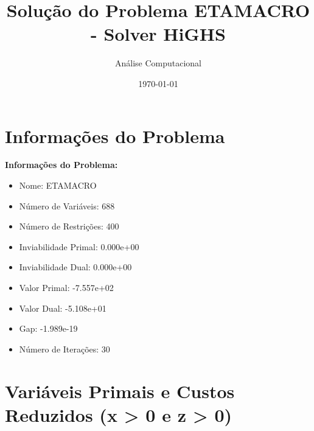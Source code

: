\documentclass[12pt]{article}
\title{Solução do Problema ETAMACRO - Solver HiGHS}
\author{Análise Computacional}
\date{\today}
\begin{document}
\maketitle

\section{Informações do Problema}

\textbf{Informações do Problema:}
\begin{itemize}
\item Nome: ETAMACRO
\item Número de Variáveis: 688
\item Número de Restrições: 400
\item Inviabilidade Primal: 0.000e+00
\item Inviabilidade Dual: 0.000e+00
\item Valor Primal: -7.557e+02
\item Valor Dual: -5.108e+01
\item Gap: -1.989e-19
\item Número de Iterações: 30
\end{itemize}


\section{Variáveis Primais e Custos Reduzidos (x > 0 e z > 0)}
\end{document}
